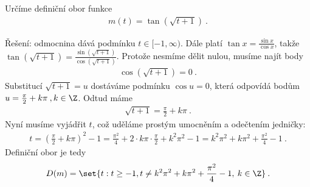 \begin{example}
    Určíme definiční obor funkce 
    \begin{align*}
        m(t) = \tan (\sqrt{t+1}) \:.
    \end{align*}

    Řešení: odmocnina dává podmínku $t \in [-1,\infty)$. Dále platí $\tan x = \frac{\sin x}{\cos x} $, takže $\tan (\sqrt {t+1}) = \frac{\sin (\sqrt {t+1})}{\cos (\sqrt {t+1})}$. Protože nesmíme dělit nulou, musíme najít body \begin{align}
        \cos (\sqrt{t+1}) = 0 \:.
    \end{align}
    Substitucí $\sqrt{t+1} = u$ dostáváme podmínku $\cos u =0$, která odpovídá bodům $u = \frac{\pi}{2} + k \pi \:, k \in \Z$. Odtud máme \begin{align}
        \sqrt{t+1} = \frac{\pi}{2} + k \pi \:.
    \end{align}
    Nyní musíme vyjádřit $t$, což uděláme prostým umocněním a odečtením jedničky:
    \begin{align}
        t =  \left( \frac{\pi}{2} + k \pi \right)^2 - 1 = \frac{\pi^2}{4} + 2 \cdot k \pi \cdot \frac{\pi}{2} + k^2 \pi^2 - 1 = k^2 \pi^2 + k \pi^2 + \frac{\pi^2}{4} - 1 \:.
    \end{align}
    Definiční obor je tedy \begin{align}
        D(m) = \set{t : t \geq -1, t \neq k^2 \pi^2 + k \pi^2 + \frac{\pi^2}{4} - 1, \: k \in \Z} \:.
    \end{align}
\end{example}

